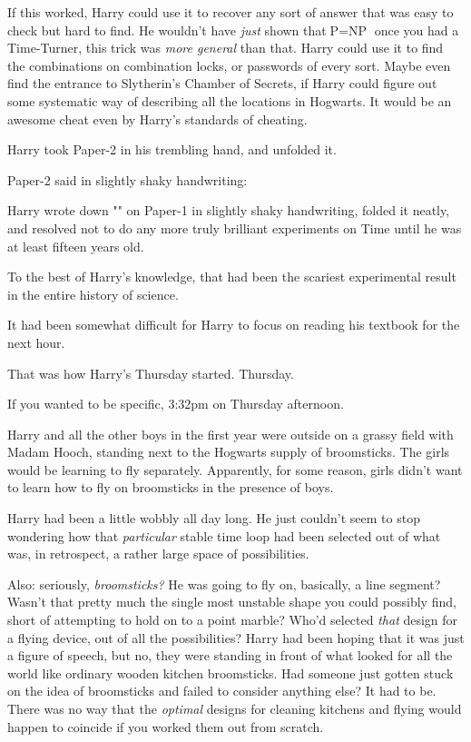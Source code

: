 If this worked, Harry could use it to recover any sort of answer that was easy
to check but hard to find. He wouldn't have \emph{just} shown that$\mbox{P}=\mbox{NP}$ once
you had a Time-Turner, this trick was \emph{more general} than that. Harry
could use it to find the combinations on combination locks, or passwords of
every sort. Maybe even find the entrance to Slytherin's Chamber of Secrets, if
Harry could figure out some systematic way of describing all the locations in
Hogwarts. It would be an awesome cheat even by Harry's standards of cheating.

Harry took Paper-2 in his trembling hand, and unfolded it.

Paper-2 said in slightly shaky handwriting:


Harry wrote down "" on Paper-1 in slightly shaky
handwriting, folded it neatly, and resolved not to do any more truly brilliant
experiments on Time until he was at least fifteen years old.

To the best of Harry's knowledge, that had been the scariest experimental
result in the entire history of science.

It had been somewhat difficult for Harry to focus on reading his textbook for
the next hour.

That was how Harry's Thursday started.
\later
Thursday.

If you wanted to be specific, 3:32pm on Thursday afternoon.

Harry and all the other boys in the first year were outside on a grassy field
with Madam Hooch, standing next to the Hogwarts supply of broomsticks. The
girls would be learning to fly separately. Apparently, for some reason, girls
didn't want to learn how to fly on broomsticks in the presence of boys.

Harry had been a little wobbly all day long. He just couldn't seem to stop
wondering how that \emph{particular} stable time loop had been selected out of
what was, in retrospect, a rather large space of possibilities.

Also: seriously, \emph{broomsticks?} He was going to fly on, basically, a line
segment? Wasn't that pretty much the single most unstable shape you could
possibly find, short of attempting to hold on to a point marble? Who'd selected
\emph{that} design for a flying device, out of all the possibilities? Harry had
been hoping that it was just a figure of speech, but no, they were standing in
front of what looked for all the world like ordinary wooden kitchen
broomsticks. Had someone just gotten stuck on the idea of broomsticks and
failed to consider anything else? It had to be. There was no way that the
\emph{optimal} designs for cleaning kitchens and flying would happen to
coincide if you worked them out from scratch.

